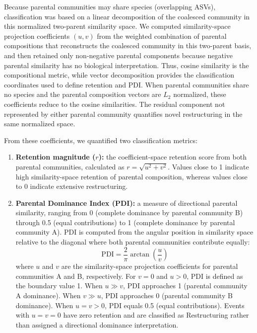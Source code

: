 Because parental communities may share species (overlapping ASVs), classification was based on a linear decomposition of the coalesced community in this normalized two-parent similarity space. We computed similarity-space projection coefficients $(u, v)$ from the weighted combination of parental compositions that reconstructs the coalesced community in this two-parent basis, and then retained only non-negative parental components because negative parental similarity has no biological interpretation. Thus, cosine similarity is the compositional metric, while vector decomposition provides the classification coordinates used to define retention and PDI. When parental communities share no species and the parental composition vectors are $L_2$ normalized, these coefficients reduce to the cosine similarities. The residual component not represented by either parental community quantifies novel restructuring in the same normalized space.

From these coefficients, we quantified two classification metrics:
\begin{enumerate}
\item \textbf{Retention magnitude ($r$):} the coefficient-space retention score from both parental communities, calculated as $r = \sqrt{u^2 + v^2}$. Values close to 1 indicate high similarity-space retention of parental composition, whereas values close to 0 indicate extensive restructuring.
\item \textbf{Parental Dominance Index (PDI):} a measure of directional parental similarity, ranging from 0 (complete dominance by parental community B) through 0.5 (equal contributions) to 1 (complete dominance by parental community A). PDI is computed from the angular position in similarity space relative to the diagonal where both parental communities contribute equally:
\begin{equation}
\text{PDI} = \frac{2}{\pi} \arctan\left(\frac{u}{v}\right)
\label{eq:pdi}
\end{equation}
where $u$ and $v$ are the similarity-space projection coefficients for parental communities A and B, respectively. For $v=0$ and $u>0$, PDI is defined as the boundary value 1. When $u \gg v$, PDI approaches 1 (parental community A dominance). When $v \gg u$, PDI approaches 0 (parental community B dominance). When $u = v > 0$, PDI equals 0.5 (equal contributions). Events with $u=v=0$ have zero retention and are classified as Restructuring rather than assigned a directional dominance interpretation.
\end{enumerate}

